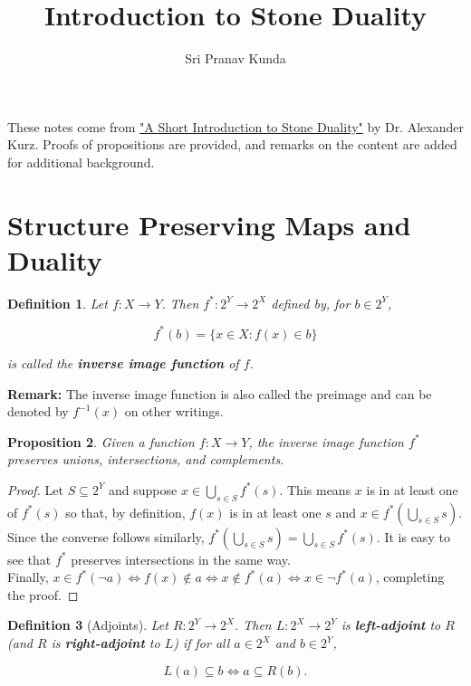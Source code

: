 \documentclass{article}
\title{Introduction to Stone Duality}
\author{Sri Pranav Kunda}
\date{}
\newtheorem{proposition}{Proposition}[section]
\newtheorem{definition}[proposition]{Definition}
\numberwithin{equation}{section}
\begin{document}
\maketitle

These notes come from \href{https://hackmd.io/@alexhkurz/S1W8SC0Tc}{"A Short Introduction to Stone Duality"} by Dr. Alexander Kurz. Proofs of propositions are provided, and remarks on the content are added for additional background. 


\section{Structure Preserving Maps and Duality}

\begin{definition}
Let $f : X \to Y$. Then $f^* : 2^Y \to 2^X$ defined by, for $b \in 2^Y$,

$$f^*(b) = \{x \in X: f(x) \in b\}$$

is called the \textbf{inverse image function} of $f$.
\end{definition}

\textbf{Remark: } The inverse image function is also called the preimage and can be denoted by $f^{-1}(x)$ on other writings. 

\begin{proposition}\label{thm:inv-image-preserves-structure}
Given a function $f : X \to Y$, the inverse image function $f^*$ preserves unions, intersections, and complements. 
\end{proposition}

\begin{proof}
Let $S \subseteq 2^Y$ and suppose $x \in \bigcup_{s \in S} f^*(s)$. This means $x$ is in at least one of $f^*(s)$ so that, by definition, $f(x)$ is in at least one $s$ and $x \in f^*(\bigcup_{s \in S} s)$. \\

Since the converse follows similarly, $f^*(\bigcup_{s \in S} s) = \bigcup_{s \in S} f^*(s)$. It is easy to see that $f^*$ preserves intersections in the same way. \\

Finally, $x \in f^*(\neg a) \Longleftrightarrow f(x) \not\in a \Longleftrightarrow x \not\in f^*(a) \Longleftrightarrow x \in \neg f^*(a)$, completing the proof.
\end{proof}

\begin{definition}[Adjoints]
Let $R : 2^Y \to 2^X$. Then $L : 2^X \to 2^Y$ is \textbf{left-adjoint} to $R$ (and $R$ is \textbf{right-adjoint} to $L$) if for all $a \in 2^X$ and $b \in 2^Y$,

\begin{equation} \label{eq:ajdoints}
L(a) \subseteq b \Longleftrightarrow a \subseteq R(b).
\end{equation}
\end{definition}
\end{document}
